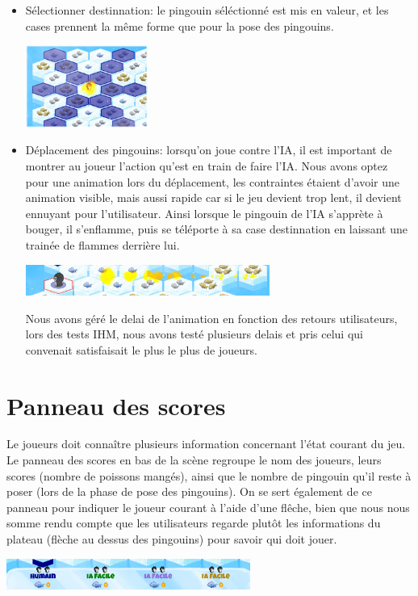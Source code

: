 \documentclass{report}
\begin{document}
\begin{itemize}
\item Sélectionner destinnation: le pingouin séléctionné est mis en valeur, et les cases prennent la même forme que pour la pose des pingouins.
\begin{center}
   \includegraphics[width=4cm]{image/case_select_dest.png}    
\end{center}

\item Déplacement des pingouins: lorsqu'on joue contre l'IA, il est important de montrer au joueur l'action qu'est en train de faire l'IA. Nous avons optez pour une animation lors du déplacement, les contraintes étaient d'avoir une animation visible, mais aussi rapide car si le jeu devient trop lent, il devient ennuyant pour l'utilisateur. Ainsi lorsque le pingouin de l'IA s'apprète à bouger, il s'enflamme, puis se téléporte à sa case destinnation en laissant une trainée de flammes derrière lui.
  \begin{center}
    \includegraphics[width=8cm]{image/pingouin_deplacement.png}    
  \end{center}
  Nous avons géré le delai de l'animation en fonction des retours utilisateurs, lors des tests IHM, nous avons testé plusieurs delais et pris celui qui convenait satisfaisait le plus le plus de joueurs.
\end{itemize}

\section{Panneau des scores}
Le joueurs doit connaître plusieurs information concernant l'état courant du jeu. Le panneau des scores en bas de la scène regroupe le nom des joueurs, leurs scores (nombre de poissons mangés), ainsi que le nombre de pingouin qu'il reste à poser (lors de la phase de pose des pingouins). On se sert également de ce panneau pour indiquer le joueur courant à l'aide d'une flêche, bien que nous nous somme rendu compte que les utilisateurs regarde plutôt les informations du plateau (flèche au dessus des pingouins) pour savoir qui doit jouer.
  \begin{center}
    \includegraphics[width=8cm]{image/tableau_scores.png}    
  \end{center}
\end{document}
